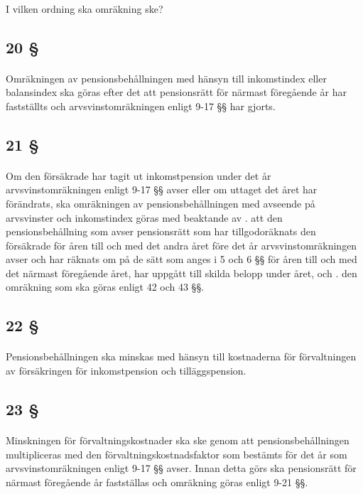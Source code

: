 \documentclass[a4paper,notitlepage,openany,10pt]{book}
\begin{document}
\paragraph*{}
I vilken ordning ska omräkning ske?
\subsection*{20 §}
\paragraph*{}
Omräkningen av pensionsbehållningen med hänsyn till inkomstindex eller balansindex ska göras efter det att pensionsrätt för närmast föregående år har fastställts och arvsvinstomräkningen enligt 9-17 §§ har gjorts.
\subsection*{21 §}
\paragraph*{}
Om den försäkrade har tagit ut inkomstpension under det år arvsvinstomräkningen enligt 9-17 §§ avser eller om uttaget det året har förändrats, ska omräkningen av pensionsbehållningen med avseende på arvsvinster och inkomstindex göras med beaktande av
. att den pensionsbehållning som avser pensionsrätt som har tillgodoräknats den försäkrade för åren till och med det andra året före det år arvsvinstomräkningen avser och har räknats om på de sätt som anges i 5 och 6 §§ för åren till och med det närmast föregående året, har uppgått till skilda belopp under året, och
. den omräkning som ska göras enligt 42 och 43 §§.
\subsection*{22 §}
\paragraph*{}
Pensionsbehållningen ska minskas med hänsyn till kostnaderna för förvaltningen av försäkringen för inkomstpension och tilläggspension.
\subsection*{23 §}
\paragraph*{}
Minskningen för förvaltningskostnader ska ske genom att pensionsbehållningen multipliceras med den förvaltningskostnadsfaktor som bestämts för det år som arvsvinstomräkningen enligt 9-17 §§ avser. Innan detta görs ska pensionsrätt för närmast föregående år fastställas och omräkning göras enligt 9-21 §§.
\end{document}
